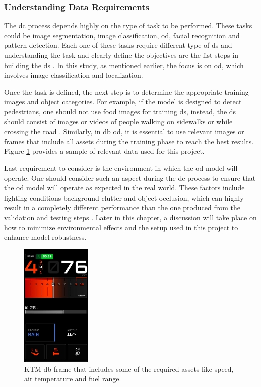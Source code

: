 \subsubsection{Understanding Data Requirements}
The \gls{dc} process depends highly on the type of task to be performed. These tasks could be image segmentation, image classification, \gls{od}, facial recognition and pattern detection. Each one of these tasks require different type of \gls{ds} and understanding the task and clearly define the objectives are the fist steps in building the \gls{ds} \cite{AIMultiple_Computer_Vision_Training_Data}. In this study, as mentioned earlier, the focus is on \gls{od}, which involves image classification and localization.

Once the task is defined, the next step is to determine the appropriate training images and object categories. For example, if the model is designed to detect pedestrians, one should not use food images for training \gls{ds}, instead, the \gls{ds} should consist of images or videos of people walking on sidewalks or while crossing the road \cite{AIMultiple_Computer_Vision_Training_Data}. Similarly, in \gls{db} \gls{od}, it is essential to use relevant images or frames that include all assets during the training phase to reach the best results. Figure \ref{KTM_DB_Unlabelled} provides a sample of relevant data used for this project. 

Last requirement to consider is the environment in which the \gls{od} model will operate. One should consider such an aspect during the \gls{dc} process to ensure that the \gls{od} model will operate as expected in the real world. These factors include lighting conditions background clutter and object occlusion, which can highly result in a completely different performance than the one produced from the validation and testing steps \cite{AIMultiple_Computer_Vision_Training_Data}. Later in this chapter, a discussion will take place on how to minimize environmental effects and the setup used in this project to enhance model robustness.

\begin{figure}[!htb] 
    \centering
    \includegraphics[width=0.3\textwidth]{Figures/Portrait_MainScreenPSD.JPG}
    \caption{KTM \gls{db} frame that includes some of the required assets like speed, air temperature and fuel range.}
    \label{KTM_DB_Unlabelled}
\end{figure}

